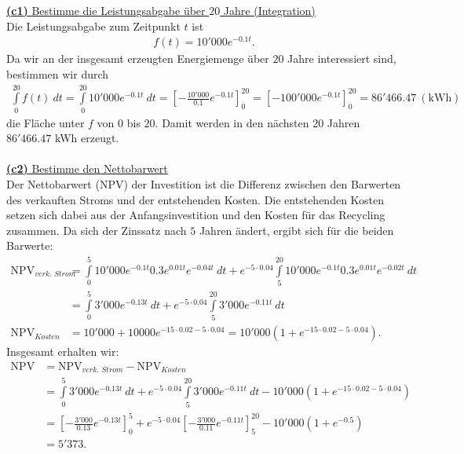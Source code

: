 \underline{\textbf{(c1)} Bestimme die Leistungsabgabe über $20$ Jahre (Integration)}\\
Die Leistungsabgabe zum Zeitpunkt $t$ ist 
\begin{align*}
	f(t) = 10'000 e^{-0.1 t}.
\end{align*}
Da wir an der insgesamt erzeugten Energiemenge über $20$ Jahre interessiert sind, bestimmen wir durch
\begin{align*}
	\int 
	\limits_{0}^{20}
	f(t)
	\ dt 
	= 
	\int 
	\limits_{0}^{20}
	10'000 e^{-0.1 t}
	\ dt 
	= 
	\left[-\frac{10'000}{0.1} e^{-0.1 t}\right]_0^{20}
	= 
	\left[-100'000 e^{-0.1 t}\right]_0^{20}
	= 
	86'466.47 \ \mathrm{(kWh)}
\end{align*}
die Fläche unter $f$ von $0$ bis $20$.
Damit werden in den nächsten $20$ Jahren $86'466.47 $ kWh erzeugt.\\
\\
\newpage
\underline{\textbf{(c2)} Bestimme den Nettobarwert}\\
Der Nettobarwert ($\mathrm{NPV}$) der Investition ist die Differenz zwischen den Barwerten des verkauften Stroms und der entstehenden Kosten.
Die entstehenden Kosten setzen sich dabei aus der Anfangsinvestition und den Kosten für das Recycling zusammen.
Da sich der Zinssatz nach $5$ Jahren ändert, ergibt sich für die beiden Barwerte:
\begin{align*}
	\mathrm{NPV}_{\textit{verk. Strom}}
	&=
	\int \limits_{0}^5 
	10'000 e^{-0.1 t} 0.3 e^{0.01t} e^{-0.04t} \ dt
	+
	e^{-5 \cdot 0.04}
	\int \limits_{5}^{20}
	10'000 e^{-0.1 t} 0.3 e^{0.01t} e^{-0.02t} \ dt\\
	&=
	\int \limits_{0}^5 
	3'000 e^{-0.13 t}  \ dt
	+
	e^{-5 \cdot 0.04}
	\int \limits_{5}^{20}
	3'000 e^{-0.11 t} \ dt\\
	\mathrm{NPV}_{\textit{Kosten}}
	&=
	10'000 + 10000 e^{-15 \cdot 0.02 - 5 \cdot 0.04}
	= 
	10'000 ( 1 + e^{-15 \cdot 0.02 - 5 \cdot 0.04}). 
\end{align*}
Insgesamt erhalten wir:
\begin{align*}
	\mathrm{NPV} &= 
	\mathrm{NPV}_{\textit{verk. Strom}} - \mathrm{NPV}_{\textit{Kosten}}\\
	&=
	\int \limits_{0}^5 
	3'000 e^{-0.13 t}  \ dt
	+
	e^{-5 \cdot 0.04}
	\int \limits_{5}^{20}
	3'000 e^{-0.11 t} \ dt
	-
	10'000 ( 1 + e^{-15 \cdot 0.02 - 5 \cdot 0.04})\\
	&=
	\left[-\frac{3'000}{0.13} e^{-0.13 t}\right]_0^5
	+
	e^{-5 \cdot 0.04}
	\left[-\frac{3'000}{0.11} e^{-0.11 t}\right]_5^{20}
	-
	10'000 ( 1 + e^{-0.5})\\
	&=
	5'373.
\end{align*}

\newpage


